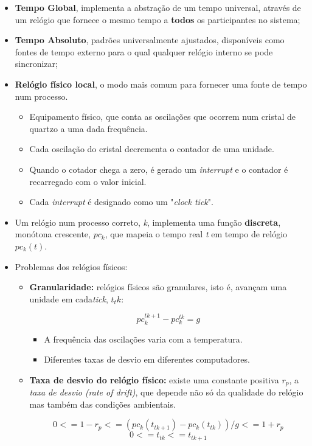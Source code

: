 \documentclass{article}
\begin{document}
\begin{itemize}
	\item \textbf{Tempo Global}, implementa a abstração de um tempo universal, através de um relógio que fornece o mesmo tempo a \textbf{todos} os participantes no sistema;
	\item \textbf{Tempo Absoluto}, padrões universalmente ajustados, disponíveis como fontes de tempo externo para o qual qualquer relógio interno se pode sincronizar;
	\item \textbf{Relógio físico local}, o modo mais comum para fornecer uma fonte de tempo num processo.
	\begin{itemize}
	    \item Equipamento físico, que conta as oscilações que ocorrem num cristal de quartzo a uma dada frequência.
	    \item Cada oscilação do cristal decrementa o contador de uma unidade.
	    \item Quando o cotador chega a zero, é gerado um \textit{interrupt} e o contador é recarregado com o valor inicial.
	    \item Cada \textit{interrupt} é designado como um "\textit{clock tick}".
	\end{itemize}
	\item Um relógio num processo correto, \textit{k}, implementa uma função \textbf{discreta}, monótona crescente, $pc_k$, que mapeia o tempo real \textit{t} em tempo de relógio $pc_k(t)$.
	\item Problemas dos relógios físicos:
	    \begin{itemize}
	        \item \textbf{Granularidade:} relógios físicos são granulares, isto é, avançam uma unidade em cada\textit{tick}, $t_tk$:
	        
	        \[ pc_k ^ {tk+1} - pc_k ^ {tk} = g\]
	        \begin{itemize}
	            \item A frequência das oscilações varia com a temperatura.
	        \item Diferentes taxas de desvio em diferentes computadores.
	        \end{itemize}
	        \item \textbf{Taxa de desvio do relógio físico:} existe uma constante positiva $r_p$, a \textit{taxa de desvio (rate of drift)}, que depende não só da qualidade do relógio mas também das condições ambientais.
	        
	        \[ 0<= 1-r_p<= (pc_k(t_{tk+1}) - pc_k(t_{tk})) / g <= 1+r_p\]
	        \[ 0 <= t_{tk} <= t_{tk+1}\]
	    \end{itemize}
\end{itemize}
\end{document}
